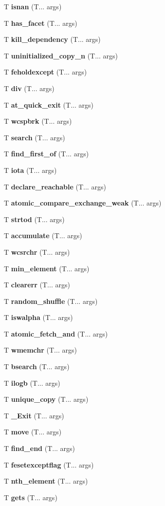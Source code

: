 \begin{DoxyCompactItemize}
T \textbf{ isnan} (T... args)
\item 
T \textbf{ has\+\_\+facet} (T... args)
\item 
T \textbf{ kill\+\_\+dependency} (T... args)
\item 
T \textbf{ uninitialized\+\_\+copy\+\_\+n} (T... args)
\item 
T \textbf{ feholdexcept} (T... args)
\item 
T \textbf{ div} (T... args)
\item 
T \textbf{ at\+\_\+quick\+\_\+exit} (T... args)
\item 
T \textbf{ wcspbrk} (T... args)
\item 
T \textbf{ search} (T... args)
\item 
T \textbf{ find\+\_\+first\+\_\+of} (T... args)
\item 
T \textbf{ iota} (T... args)
\item 
T \textbf{ declare\+\_\+reachable} (T... args)
\item 
T \textbf{ atomic\+\_\+compare\+\_\+exchange\+\_\+weak} (T... args)
\item 
T \textbf{ strtod} (T... args)
\item 
T \textbf{ accumulate} (T... args)
\item 
T \textbf{ wcsrchr} (T... args)
\item 
T \textbf{ min\+\_\+element} (T... args)
\item 
T \textbf{ clearerr} (T... args)
\item 
T \textbf{ random\+\_\+shuffle} (T... args)
\item 
T \textbf{ iswalpha} (T... args)
\item 
T \textbf{ atomic\+\_\+fetch\+\_\+and} (T... args)
\item 
T \textbf{ wmemchr} (T... args)
\item 
T \textbf{ bsearch} (T... args)
\item 
T \textbf{ ilogb} (T... args)
\item 
T \textbf{ unique\+\_\+copy} (T... args)
\item 
T \textbf{ \+\_\+\+Exit} (T... args)
\item 
T \textbf{ move} (T... args)
\item 
T \textbf{ find\+\_\+end} (T... args)
\item 
T \textbf{ fesetexceptflag} (T... args)
\item 
T \textbf{ nth\+\_\+element} (T... args)
\item 
T \textbf{ gets} (T... args)
\item 

\end{DoxyCompactItemize}
